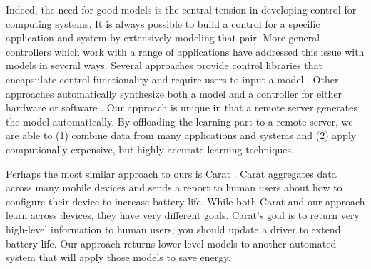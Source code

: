 Indeed, the need for good models is the central tension in developing
control for computing systems.  It is always possible to build a
control for a specific application and system by extensively modeling
that pair.  More general controllers which work with a range of
applications have addressed this issue with models in several ways.
Several approaches provide control libraries that encapsulate control
functionality and require users to input a model
\cite{ControlWare,Sojka,Rajkumar,POET}.  Other approaches
automatically synthesize both a model and a controller for either
hardware \cite{josep-isca2016} or software \cite{ICSE2014,FSE2015}.
  Our approach is unique in that a remote server
generates the model automatically.  By offloading the learning part to
a remote server, we are able to (1) combine data from many
applications and systems and (2) apply computionally expensive, but
highly accurate learning techniques.


Perhaps the most similar approach to ours is Carat \cite{}.  Carat
aggregates data across many mobile devices and sends a report to human
users about how to configure their device to increase battery life.
While both Carat and our approach learn across devices, they have very
different goals.  Carat's goal is to return very high-level
information to human users; \eg you should update a driver to extend
battery life.  Our approach returns lower-level models to another
automated system that will apply those models to save energy.

